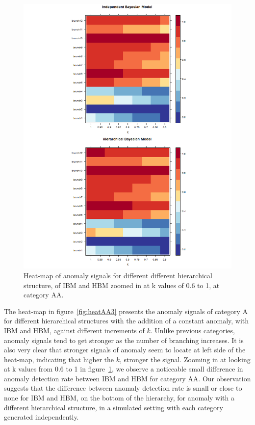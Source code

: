 		\begin{figure}[!h]
			\centering
			\includegraphics[width=1\linewidth]{../../R-codes/JAGS/plots/sim2/heatAA2}
			\caption{Heat-map of anomaly signals for different different hierarchical structure, of IBM and HBM zoomed in at k values of 0.6 to 1, at category AA.}
			\label{fig:heatAAh3}
		\end{figure}
	
	\newpage
		
		The heat-map in figure~\ref{fig:heatAA3} presents the anomaly signals of category A for different hierarchical structures with the addition of a constant anomaly, with IBM and HBM, against different increments of $k$. Unlike previous categories, anomaly signals tend to get stronger as the number of branching increases. It is also very clear that stronger signals of anomaly seem to locate at left side of the heat-map, indicating that higher the $k$, stronger the signal. Zooming in at looking at k values from 0.6 to 1 in figure~\ref{fig:heatAAh3}, we observe a noticeable small difference in anomaly detection rate between IBM and HBM for category AA. Our observation suggests that the difference between anomaly detection rate is small or close to none for IBM and HBM, on the bottom of the hierarchy, for anomaly with a different hierarchical structure, in a simulated setting with each category generated independently. 
		
